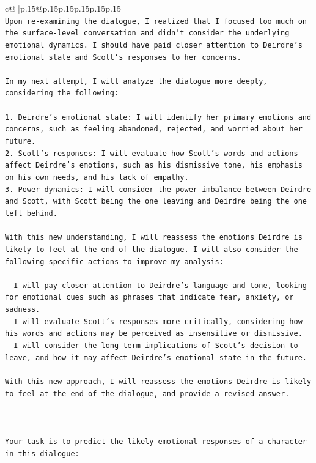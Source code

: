 \documentclass{article}
\begin{document}
{\begin{supertabular}{c@{$\;$}|p{.15\linewidth}@{}p{.15\linewidth}p{.15\linewidth}p{.15\linewidth}p{.15\linewidth}p{.15\linewidth}}
{{{\\ 
\texttt{Upon re{-}examining the dialogue, I realized that I focused too much on the surface{-}level conversation and didn't consider the underlying emotional dynamics. I should have paid closer attention to Deirdre's emotional state and Scott's responses to her concerns. } \\
\\ 
\texttt{In my next attempt, I will analyze the dialogue more deeply, considering the following:} \\
\\ 
\texttt{1. Deirdre's emotional state: I will identify her primary emotions and concerns, such as feeling abandoned, rejected, and worried about her future.} \\
\texttt{2. Scott's responses: I will evaluate how Scott's words and actions affect Deirdre's emotions, such as his dismissive tone, his emphasis on his own needs, and his lack of empathy.} \\
\texttt{3. Power dynamics: I will consider the power imbalance between Deirdre and Scott, with Scott being the one leaving and Deirdre being the one left behind.} \\
\\ 
\texttt{With this new understanding, I will reassess the emotions Deirdre is likely to feel at the end of the dialogue. I will also consider the following specific actions to improve my analysis:} \\
\\ 
\texttt{{-} I will pay closer attention to Deirdre's language and tone, looking for emotional cues such as phrases that indicate fear, anxiety, or sadness.} \\
\texttt{{-} I will evaluate Scott's responses more critically, considering how his words and actions may be perceived as insensitive or dismissive.} \\
\texttt{{-} I will consider the long{-}term implications of Scott's decision to leave, and how it may affect Deirdre's emotional state in the future.} \\
\\ 
\texttt{With this new approach, I will reassess the emotions Deirdre is likely to feel at the end of the dialogue, and provide a revised answer.} \\
\\ 
\\ 
\\ 
\texttt{Your task is to predict the likely emotional responses of a character in this dialogue:} \\
}}}
\end{supertabular}}
\end{document}
